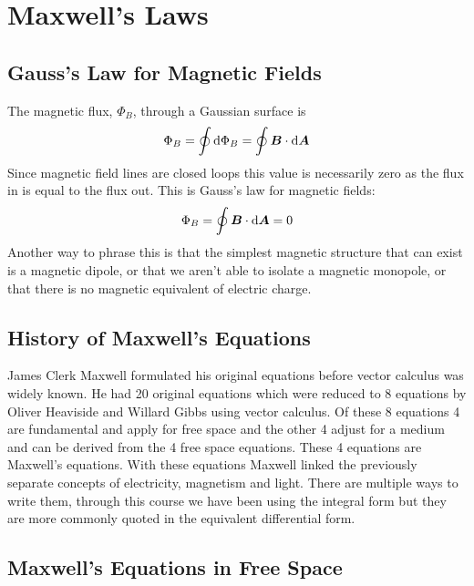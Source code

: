 \documentclass{article}
\begin{document}
    \section{Maxwell's Laws}
    \subsection{Gauss's Law for Magnetic Fields}
    The magnetic flux, \(\Phi_B\), through a Gaussian surface is
    \[\Phi_B = \oint\dd\Phi_B = \oint\bm{B}\cdot\dd\bm{A}\]
    Since magnetic field lines are closed loops this value is necessarily zero as the flux in is equal to the flux out.
    This is Gauss's law for magnetic fields:
    \[\Phi_B = \oint\bm{B}\cdot\dd\bm{A} = 0\]
    Another way to phrase this is that the simplest magnetic structure that can exist is a magnetic dipole, or that we aren't able to isolate a magnetic monopole, or that there is no magnetic equivalent of electric charge.
    
    \subsection{History of Maxwell's Equations}
    James Clerk Maxwell formulated his original equations before vector calculus was widely known.
    He had 20 original equations which were reduced to 8 equations by Oliver Heaviside and Willard Gibbs using vector calculus.
    Of these 8 equations 4 are fundamental and apply for free space and the other 4 adjust for a medium and can be derived from the 4 free space equations.
    These 4 equations are Maxwell's equations.
    With these equations Maxwell linked the previously separate concepts of electricity, magnetism and light.
    There are multiple ways to write them, through this course we have been using the integral form but they are more commonly quoted in the equivalent differential form.
    
    \subsection{Maxwell's Equations in Free Space}
\end{document}

